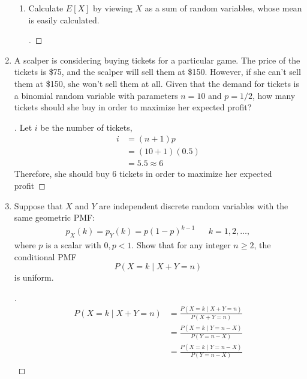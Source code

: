 \documentclass[paper=usletter, fontsize=12pt]{article}
\begin{document}
\begin{enumerate}[label=\textbf{\arabic*}.]
\begin{enumerate}[label=(\alph*)]
            \item Calculate $E[X]$ by viewing $X$ as a sum of random variables,
            whose mean is easily calculated.
            \begin{proof}[\unskip\nopunct]
            \end{proof}
            \vspace{0.2in}

        \end{enumerate}

        \item
        A scalper is considering buying tickets for a particular game. The
        price of the tickets is \$75, and the scalper will sell them at \$150.
        However, if she can't sell them at \$150, she won't sell them at all.
        Given that the demand for tickets is a binomial random variable with
        parameters $n=10$ and $p=1/2$, how many tickets should she buy in order
        to maximize her expected profit?
        \begin{proof}[\unskip\nopunct]
            Let $i$ be the number of tickets,
            \begin{align*}
                i & = (n+1)p \\
                & = (10 + 1)(0.5) \\
                & = 5.5 \approx 6
            \end{align*}
            Therefore, she should buy 6 tickets in order to maximize her
            expected profit \qedhere
        \end{proof}
        \vspace{0.2in}

        \item
        Suppose that $X$ and $Y$ are independent discrete random variables with
        the same geometric PMF:
        \begin{align*}
            p_X(k)=p_Y(k)=p(1-p)^{k-1}&& k=1,2,\ldots,
        \end{align*}
        where $p$ is a scalar with $0,p<1$. Show that for any integer $n \ge
        2$, the conditional PMF
        \begin{equation*}
            P(X=k \mid X+Y=n)
        \end{equation*}
        is uniform.
        \begin{proof}[\unskip\nopunct]
            \begingroup
            \addtolength{\jot}{1em}
            \begin{align*}
                P(X=k \mid X+Y=n) & = \frac{P(X=k \mid X+Y=n)}{P(X+Y=n)} \\
                & = \frac{P(X=k \mid Y=n-X)}{P(Y=n-X)}\\
                & = \frac{P(X=k \mid Y=n-X)}{P(Y=n-X)}\\
            \end{align*}
            \endgroup
        \end{proof}
        \vspace{0.2in}


\end{enumerate}
\end{document}
